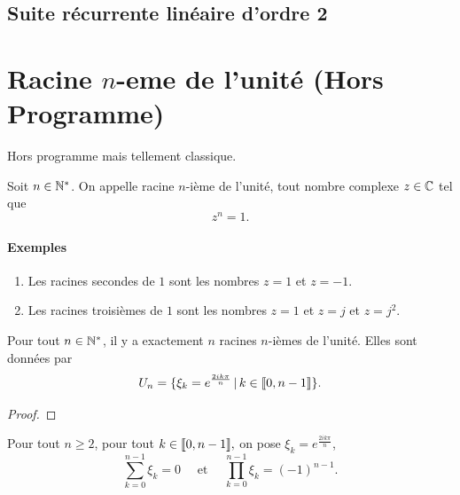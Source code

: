 \documentclass[a4paper, 11pt]{article}
\begin{document}
\subsection{Suite récurrente linéaire d'ordre 2}


\section{Racine $n$-eme de l'unité (Hors Programme)}
Hors programme mais tellement classique. 
\begin{defi}
Soit $n\in \mathbb{N}^*$. On appelle racine $n$-ième de l'unité, tout nombre complexe $z\in \mathbb{C}$ tel que 
$$z^n=1.$$
\end{defi}

\paragraph{Exemples }
\begin{enumerate}
\item Les racines secondes de $1$ sont  les nombres $z=1$ et $z=-1$.
\item Les racines troisièmes de $1$ sont  les nombres $z=1$ et $z=j$ et $z=j^2$.
\end{enumerate}

\begin{theorem}
Pour tout $n\in \mathbb{N}^*$, il y a exactement $n$ racines $n$-ièmes de l'unité. Elles sont données par 
$$U_n =\{ \xi_k =e^{\frac{2ik\pi}{n}}\, |\, k\in \llbracket 0,n-1\rrbracket\}.$$
\end{theorem}

\begin{proof}

\end{proof}

\begin{exo}
Pour tout $n\geq 2$, pour tout $k\in \llbracket 0,n-1\rrbracket,$ on pose $ \xi_k =e^{\frac{2ik\pi}{n}}$,
$$\sum_{k=0}^{n-1} \xi_k =0 \quad \text{ et } \quad \prod_{k=0}^{n-1} \xi_k =(-1)^{n-1}.$$
\end{exo}
\end{document}
